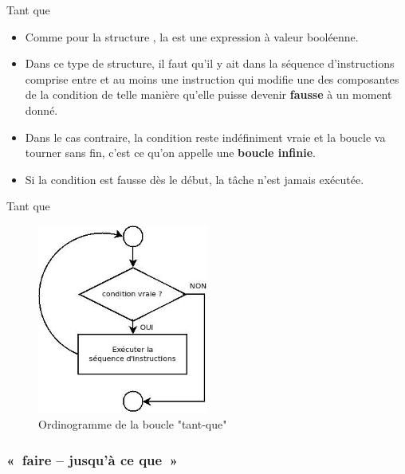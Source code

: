 \begin{frame}{Tant que}
	\begin{itemize}
		\item
			Comme pour la structure , la  est
			une expression à valeur booléenne.
		\item
			Dans ce type de structure, il faut
			qu’il y ait dans la séquence d’instructions comprise entre
			 et  au moins une
			instruction qui modifie une des composantes de la condition de telle
			manière qu’elle puisse devenir \textbf{fausse} à un moment donné.
		\item 
			Dans le cas contraire, la condition reste indéfiniment vraie et la boucle va
			tourner sans fin, c'est ce qu'on appelle une \textbf{boucle infinie}.
		\item
			Si la condition est fausse dès le début, 
			la tâche n'est jamais exécutée.
	\end{itemize}
\end{frame}

\begin{frame}{Tant que}
	\begin{figure}[h]
		\centering
		\includegraphics[width=0.5\textwidth]{image/boucle-tq}
		\caption{Ordinogramme de la boucle "tant-que"}
		\label{fig:boucle-tq}
	\end{figure}
\end{frame}

\subsubsection{«~faire – jusqu'à ce que~»}


